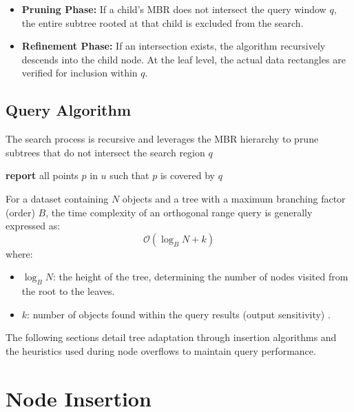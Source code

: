 \documentclass[a4paper, 10pt, titlepage]{report}
\begin{document}
\begin{itemize}
    \item \textbf{Pruning Phase:} If a child's MBR does not intersect the query window $q$, the entire subtree rooted at that child is excluded from the search.
    \item \textbf{Refinement Phase:} If an intersection exists, the algorithm recursively descends into the child node. At the leaf level, the actual data rectangles are verified for inclusion within $q$.
\end{itemize}

\subsection{Query Algorithm}
The search process is recursive and leverages the MBR hierarchy to prune subtrees that do not intersect the search region $q$

\begin{algorithm}
\caption{Range Query Algorithm}\label{alg:range_query}
\begin{algorithmic}[1]
        \State \textbf{report} all points $p$ in $u$ such that $p$ is covered by $q$
    \Else
                \State {}
            \EndIf
        \EndFor
    \EndIf
\EndProcedure
\end{algorithmic}
\end{algorithm}
For a dataset containing $N$ objects and a tree with a maximum branching factor (order) $B$, the time complexity of an orthogonal range query is generally expressed as:
\[ \mathcal{O}(\log_B N + k) \]
where:
\begin{itemize}
    \item $\log_B N$: the height of the tree, determining the number of nodes visited from the root to the leaves.
    \item $k$: number of objects found within the query results (output sensitivity) .
\end{itemize}

The following sections detail tree adaptation through insertion algorithms and the heuristics used during node overflows to maintain query performance.

\section{Node Insertion}
\end{document}

